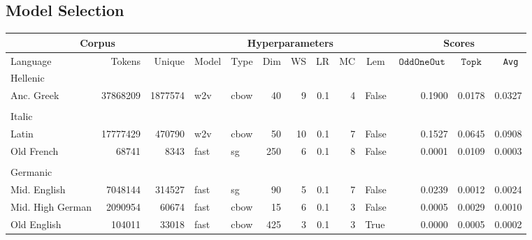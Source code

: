 \documentclass[11pt,a4paper]{article}
\DeclareMathOperator{\OddOneOut}{\texttt{OddOneOut}}
\DeclareMathOperator{\topk}{\texttt{Topk}}
\begin{document}
\subsection{Model Selection}
\begin{table}[t]
\centering
\scriptsize
\begin{tabular}{lrrllrrrrlrrr}
\toprule
\multicolumn{3}{c}{\bf Corpus} & \multicolumn{7}{c}{\bf Hyperparameters} & \multicolumn{3}{c}{\bf Scores} \\
\midrule
 \multicolumn{1}{l}{Language} & \multicolumn{1}{r}{Tokens} & \multicolumn{1}{r}{Unique} & \multicolumn{1}{l}{Model} & \multicolumn{1}{l}{Type} & \multicolumn{1}{r}{Dim} & \multicolumn{1}{r}{WS} & \multicolumn{1}{r}{LR} & \multicolumn{1}{r}{MC} & \multicolumn{1}{c}{Lem} & \multicolumn{1}{c}{\tiny$\OddOneOut$} & \multicolumn{1}{c}{$\topk$} & \multicolumn{1}{c}{\texttt{ Avg}} \\
    \midrule
    \multicolumn{13}{l}{Hellenic}\\
 \quad Anc. Greek & \num{37868209} & \num{1877574} & w2v & cbow &  \num{40} &  \num{9} &  \num{.1} &  \num{4} & False & \num{0.1900} & \num{0.0178} & \num{0.0327}\\
\multicolumn{13}{l}{}\\[-4pt]
    \multicolumn{13}{l}{Italic}\\
 \quad Latin & \num{17777429} & \num{470790} & w2v & cbow &  \num{50} &  \num{10} &  \num{.1} &  \num{7} & False &  \num{0.1527} &  \num{0.0645} &  \num{0.0908}\\ 
   \quad Old French  & \num{68741} & \num{8343} &  fast & sg & \num{250} & \num{6} & \num{.1} & \num{8}  & False & \num{0.0001} & \num{0.0109} & \num{0.0003}\\
    \multicolumn{13}{l}{}\\[-4pt]
\multicolumn{13}{l}{Germanic}\\
\quad Mid. English & \num{7048144} & \num{314527} & fast & sg & \num{90} & \num{5} & \num{.1} & \num{7} & False & \num{0.0239} & \num{0.0012} & \num{0.0024} \\
   \quad Mid. High German & \num{2090954} & \num{60674} & fast & cbow & \num{15} & \num{6} & \num{.1} & \num{3} & False & \num{0.0005} & \num{0.0029} & \num{0.0010} \\
   \quad Old English  & \num{104011} & \num{33018} & fast & cbow & \num{425} & \num{3} & \num{.1} & \num{3} & True & \num{0.0000} & \num{0.0005}  & \num{0.0002} \\

\end{tabular}
\end{table}
\end{document}
